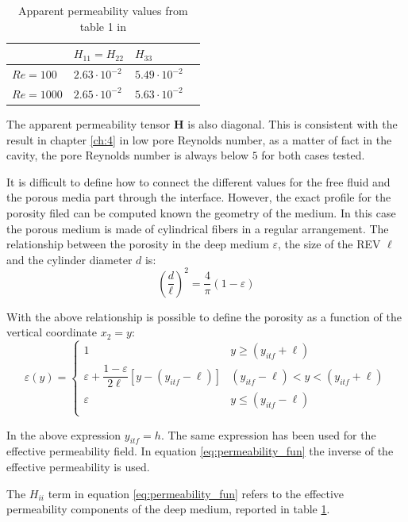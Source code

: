 \begin{table}[h]
	\centering
	\begin{tabular}{ l | l |  l   l   }
		& $H_{11} = H_{22}$ & $H_{33}$ \\ 
		\hline
		\hline
		$Re=100$ & $2.63 \cdot 10^{-2}$ & $5.49 \cdot 10^{-2}$ \\ 
		$Re=1000$ & $2.65 \cdot 10^{-2}$ & $5.63 \cdot 10^{-2}$
	\end{tabular}
	\caption{Apparent permeability values from table 1 in \citet{zampogna2016fluid}}
	\label{tab:H}
\end{table}

The apparent permeability tensor $\mathbf{H}$ is also diagonal. This is consistent with the result in chapter \ref{ch:4} in low pore Reynolds number, as a matter of fact in the cavity, the pore Reynolds number is always below $5$ for both cases tested.

It is difficult to define how to connect the different values for the free fluid and the porous media part through the interface.
However, the exact profile for the porosity filed can be computed known the geometry of the medium. In this case the porous medium is made of cylindrical fibers in a regular arrangement. The relationship between the porosity in the deep medium $\varepsilon$, the size of the REV $\ell$ and the cylinder diameter $d$ is:
$$
\left( \dfrac{d}{\ell} \right)^2 = \dfrac{4}{\pi} \left(1 - \varepsilon \right)
$$

With the above relationship is possible to define the porosity as a function of the vertical coordinate $x_2 = y$:
\begin{equation}
\varepsilon(y) = 
\begin{cases}
1 & y\geqslant(y_{itf}+\ell) \\
\varepsilon +\dfrac{1-\varepsilon}{2\ell}\left[y -\left(y_{itf} -\ell\right)\right] &  (y_{itf}-\ell)<y<(y_{itf}+\ell)\\
\varepsilon &y\leqslant(y_{itf}-\ell) \\
\end{cases}
\label{eq:porsitity_fun}
\end{equation}

In the above expression $y_{itf} = h$. The same expression has been used for the effective permeability field. In equation \eqref{eq:permeability_fun} the inverse of the effective permeability is used.

The ${H_{ii}}$ term in equation \eqref{eq:permeability_fun} refers to the effective permeability components of the deep medium, reported in table \ref{tab:H}.

